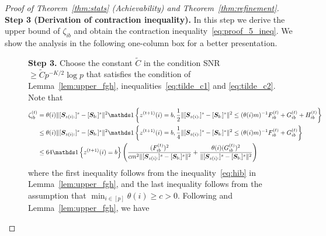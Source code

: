 \documentclass[journal]{IEEEtran}
\theoremstyle{definition}
\theoremstyle{definition}
\newcommand{\of}[1]{\left(#1\right)}
\newcommand{\offf}[1]{\left\{#1\right\}}
\newcounter{MYtempeqncnt}
\begin{document}
\begin{proof}[Proof of Theorem~\ref{thm:stats} (Achievability) and Theorem~\ref{thm:refinement}]
    {\bf Step 3 (Derivation of contraction inequality).} In this step we derive the upper bound of $\zeta_{ib}$ and obtain the contraction inequality~\eqref{eq:proof_5_ineq}. We show the analysis in the following one-column box for a better presentation. 

    
\begin{figure}[t] 
{\bf Step 3.}  Choose the constant $\tilde C$ in the condition SNR $\geq \tilde C p^{-K/2} \log p$ that satisfies the condition of Lemma~\ref{lem:upper_fgh}, inequalities~\eqref{eq:tilde_c1} and \eqref{eq:tilde_c2}. Note that  \begin{align}
        \zeta_{ib}^{(t)} &= \theta(i) \onormSize{}{ [ \mS_{ z(i):}  ]^s - [ \mS_{b:}  ]^s  }^2 \ind \offf{z^{(t+1)}(i) = b, \frac{1}{2}\onormSize{}{ [ \mS_{z(i):}  ]^s - [ \mS_{b:}  ]^s  }^2 \leq (\theta(i) m)^{-1} F_{ib}^{(t)} + G_{ib}^{(t)} + H_{ib}^{(t)} }\\
        & \leq \theta(i) \onormSize{}{ [ \mS_{ z(i):}  ]^s - [ \mS_{b:}  ]^s  }^2 \ind \offf{z^{(t+1)}(i) = b, \frac{1}{4}\onormSize{}{ [ \mS_{z(i):}  ]^s - [ \mS_{b:}  ]^s  }^2 \leq (\theta(i) m)^{-1} F_{ib}^{(t)} + G_{ib}^{(t)} } \\
        & \leq 64 \ind \offf{ z^{(t+1)}(i) = b} \of{  \frac{(F_{ib}^{(t)})^2}{ cm^2\onormSize{}{ [ \mS_{z(i):}  ]^s - [ \mS_{b:}  ]^s  }^2} + \frac{\theta(i)(G_{ib}^{(t)})^2}{ \onormSize{}{ [ \mS_{z(i):}  ]^s - [ \mS_{b:}  ]^s  }^2}    }
    \end{align}
    where the first inequality follows from the inequality~\eqref{eq:hib} in Lemma~\ref{lem:upper_fgh}, and the last inequality follows from the assumption that $\min_{i \in [p]} \theta(i) \geq c>0$. Following \cite[Step 4, Proof of Theorem 2]{han2020exact} and Lemma~\ref{lem:upper_fgh}, we have 
\setcounter{MYtempeqncnt}{\value{equation}} 


\end{figure}
\end{proof}
\end{document}
